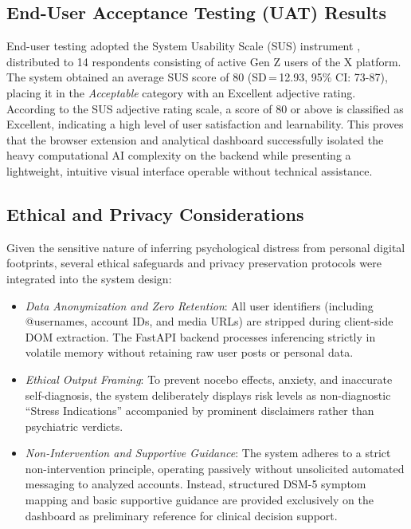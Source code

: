 \documentclass[conference]{IEEEtran}
\begin{document}
\subsection{End-User Acceptance Testing (UAT) Results}
End-user testing adopted the System Usability Scale (SUS) instrument
\cite{b_lewis}, distributed to 14 respondents consisting of active
Gen Z users of the X platform. The system obtained an average SUS
score of 80 (SD\,=\,12.93, 95\% CI: 73-87), placing it in the
\emph{Acceptable} category with an Excellent adjective rating.
According to the SUS adjective rating scale, a score of 80 or above
is classified as Excellent, indicating a high level of user satisfaction
and learnability. This proves that the browser extension and analytical
dashboard successfully isolated the heavy computational AI complexity
on the backend while presenting a lightweight, intuitive visual
interface operable without technical assistance.

\subsection{Ethical and Privacy Considerations}
Given the sensitive nature of inferring psychological distress from personal digital footprints, several ethical safeguards and privacy preservation protocols were integrated into the system design:
\begin{itemize}
    \item \emph{Data Anonymization and Zero Retention}: All user identifiers (including @usernames, account IDs, and media URLs) are stripped during client-side DOM extraction. The FastAPI backend processes inferencing strictly in volatile memory without retaining raw user posts or personal data.
    \item \emph{Ethical Output Framing}: To prevent nocebo effects, anxiety, and inaccurate self-diagnosis, the system deliberately displays risk levels as non-diagnostic ``Stress Indications'' accompanied by prominent disclaimers rather than psychiatric verdicts.
    \item \emph{Non-Intervention and Supportive Guidance}: The system adheres to a strict non-intervention principle, operating passively without unsolicited automated messaging to analyzed accounts. Instead, structured DSM-5 symptom mapping and basic supportive guidance are provided exclusively on the dashboard as preliminary reference for clinical decision support.
\end{itemize}

\end{document}
